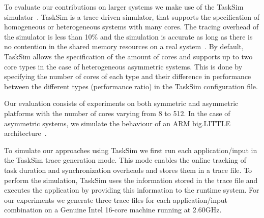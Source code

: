 \label{sec.background.simulation}
To evaluate our contributions on larger systems we make use of the TaskSim simulator~\cite{AbstrLevels_TACO12,MUSA}. 
TaskSim is a trace driven simulator, that supports the specification of homogeneous or heterogeneous systems with many cores. 
The tracing overhead of the simulator is less than 10\% and the simulation is accurate as long as there is no contention in the shared memory resources on a real system~\cite{MUSA}.
By default, TaskSim allows the specification of the amount of cores and supports up to two core types in the case of heterogeneous asymmetric systems. 
This is done by specifying the number of cores of each type and their difference in performance between the different types (performance ratio) in the TaskSim configuration file.

Our evaluation consists of experiments on both symmetric and asymmetric platforms with the number of cores varying from 8 to 512.
In the case of asymmetric systems, we simulate the behaviour of an ARM big.LITTLE architecture~\cite{ARM}.




To simulate our approaches using TaskSim we first run each application/input in the TaskSim trace generation mode.
This mode enables the online tracking of task duration and synchronization overheads and stores them in a trace file. 
To perform the simulation, TaskSim uses the information stored in the trace file and executes the application by providing this information to the runtime system.
For our experiments we generate three trace files for each application/input combination on a Genuine Intel 16-core machine running at 2.60GHz.